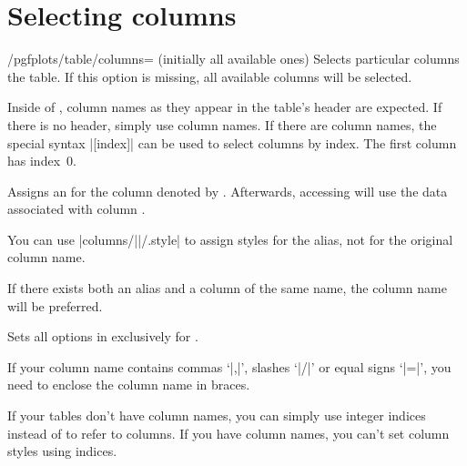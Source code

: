 \section{Selecting columns}
\begin{key}{/pgfplots/table/columns= (initially all available ones)}
	Selects particular columns the table. If this option is missing, all available columns will be selected.

	Inside of , column names as they appear in the table's header are expected. If there is no header, simply use column names. If there are column names, the special syntax |[index]| can be used to select columns by index. The first column has index~$0$.
\begin{codeexample}[]
\end{codeexample}
\end{key}

\begin{pgfplotstablealiaskey}
	Assigns an  for the column denoted by . Afterwards, accessing  will use the data associated with column .

	You can use |columns/||/.style| to assign styles for the alias, not for the original column name.

	If there exists both an alias and a column of the same name, the column name will be preferred.
\end{pgfplotstablealiaskey}

\begin{pgfplotstablecolumnkey}
	Sets all options in  exclusively for .

\begin{codeexample}[]
\end{codeexample}
	If your column name contains commas `|,|', slashes `|/|' or equal signs `|=|', you need to enclose the column name in braces.
\begin{codeexample}[width=7cm]
\end{codeexample}
	If your tables don't have column names, you can simply use integer indices instead of  to refer to columns. If you have column names, you can't set column styles using indices.
\end{pgfplotstablecolumnkey}

